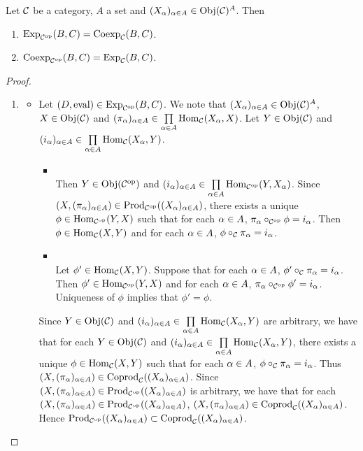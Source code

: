 \documentclass{book}
\begin{document}
	\begin{ex}
		Let $\mathcal{C}$ be a category, $A$ a set  and $(X_{\alpha})_{\alpha \in A} \in \operatorname{Obj}(\mathcal{C})^A$. Then 
		\begin{enumerate}
			\item $\operatorname{Exp}_{{\mathcal{C}}^{\text{op}}}(B, C) = \operatorname{Coexp}_{\mathcal{C}}(B, C)$.
			\item $\operatorname{Coexp}_{{\mathcal{C}}^{\text{op}}}(B, C) = \operatorname{Exp}_{\mathcal{C}}(B, C)$.
		\end{enumerate}
	\end{ex}
	
	\begin{proof}\
		\begin{enumerate}
			\item 
			\begin{itemize}
				\item Let $(D, \text{eval}) \in \operatorname{Exp}_{{\mathcal{C}}^{\text{op}}}(B, C)$. We note that $(X_{\alpha})_{\alpha \in A} \in \operatorname{Obj}(\mathcal{C})^A$, $X \in \operatorname{Obj}(\mathcal{C})$ and $(\pi_{\alpha})_{\alpha \in A} \in \prod\limits_{\alpha \in A} \operatorname{Hom}_{\mathcal{C}}(X_{\alpha}, X)$. Let $Y \in \operatorname{Obj}(\mathcal{C})$ and $(i_{\alpha})_{\alpha \in A} \in \prod\limits_{\alpha \in A} \operatorname{Hom}_{\mathcal{C}}(X_{\alpha}, Y)$. 
				\begin{itemize}
					\item {} \\
					Then $Y \in \operatorname{Obj}({\mathcal{C}}^{\text{op}})$ and $(i_{\alpha})_{\alpha \in A} \in \prod\limits_{\alpha \in A} \operatorname{Hom}_{{\mathcal{C}}^{\text{op}}}(Y, X_{\alpha})$. Since $(X, (\pi_{\alpha})_{\alpha \in A}) \in \operatorname{Prod}_{{\mathcal{C}}^{\text{op}}}((X_{\alpha})_{\alpha \in A})$, there exists a unique $\phi \in \operatorname{Hom}_{{\mathcal{C}}^{\text{op}}}(Y,X)$ such that for each $\alpha \in A$, $\pi_{\alpha} \circ_{{\mathcal{C}}^{\text{op}}} \phi = i_{\alpha}$. Then $\phi \in \operatorname{Hom}_{\mathcal{C}}(X, Y)$ and for each $\alpha \in A$, $\phi \circ_{\mathcal{C}} \pi_{\alpha} = i_{\alpha}$. 
					\item \tbf{Uniqueness:} \\
					Let $\phi' \in \operatorname{Hom}_{\mathcal{C}}(X, Y)$. Suppose that for each $\alpha \in A$,  $\phi' \circ_{\mathcal{C}} \pi_{\alpha} = i_{\alpha}$. Then $\phi' \in \operatorname{Hom}_{{\mathcal{C}}^{\text{op}}}(Y, X)$ and for each $\alpha \in A$, $\pi_{\alpha} \circ_{{\mathcal{C}}^{\text{op}}} \phi' = i_{\alpha}$. Uniqueness of $\phi$ implies that $\phi' = \phi$.
				\end{itemize}
				Since $Y \in \operatorname{Obj}(\mathcal{C})$ and $(i_{\alpha})_{\alpha \in A} \in \prod\limits_{\alpha \in A} \operatorname{Hom}_{\mathcal{C}}(X_{\alpha}, Y)$ are arbitrary, we have that for each $Y \in \operatorname{Obj}(\mathcal{C})$ and $(i_{\alpha})_{\alpha \in A} \in \prod\limits_{\alpha \in A} \operatorname{Hom}_{\mathcal{C}}(X_{\alpha}, Y)$, there exists a unique $\phi \in \operatorname{Hom}_{\mathcal{C}}(X, Y)$ such that for each $\alpha \in A$, $\phi \circ_{\mathcal{C}} \pi_{\alpha} = i_{\alpha}$. Thus $(X, (\pi_{\alpha})_{\alpha \in A}) \in \operatorname{Coprod}_{\mathcal{C}}((X_{\alpha})_{\alpha \in A})$. Since $(X, (\pi_{\alpha})_{\alpha \in A}) \in \operatorname{Prod}_{{\mathcal{C}}^{\text{op}}}((X_{\alpha})_{\alpha \in A})$ is arbitrary, we have that for each $(X, (\pi_{\alpha})_{\alpha \in A}) \in \operatorname{Prod}_{{\mathcal{C}}^{\text{op}}}((X_{\alpha})_{\alpha \in A})$, $(X, (\pi_{\alpha})_{\alpha \in A}) \in \operatorname{Coprod}_{\mathcal{C}}((X_{\alpha})_{\alpha \in A})$. Hence $\operatorname{Prod}_{{\mathcal{C}}^{\text{op}}}((X_{\alpha})_{\alpha \in A}) \subset \operatorname{Coprod}_{\mathcal{C}}((X_{\alpha})_{\alpha \in A})$.

\end{itemize}
\end{enumerate}
\end{proof}
\end{document}
